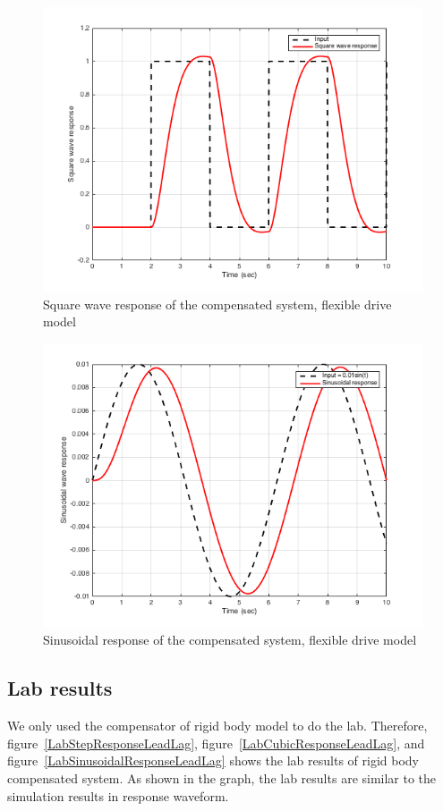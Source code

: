 \documentclass[a4paper, 12pt]{article}
\begin{document}
\begin{figure}[!htbp]
\centering
\includegraphics[scale = 0.6]{FlexibleCubicResponseLeadLag}
\caption{Square wave response of the compensated system, flexible drive model}
\label{FlexibleCubicResponseLeadLag}
\end{figure}

\begin{figure}[!htbp]
\centering
\includegraphics[scale = 0.6]{FlexibleSinusoidalResponseLeadLag}
\caption{Sinusoidal response of the compensated system, flexible drive model}
\label{FlexibleSinusoidalResponseLeadLag}
\end{figure}


\subsection{Lab results}
\hspace{2.5ex}We only used the compensator of rigid body model to do the lab. Therefore, figure~\ref{LabStepResponseLeadLag}, figure~\ref{LabCubicResponseLeadLag}, and figure~\ref{LabSinusoidalResponseLeadLag} shows the lab results of rigid body compensated system. 
As shown in the graph, the lab results are similar to the simulation results in response waveform. 
\end{document}
